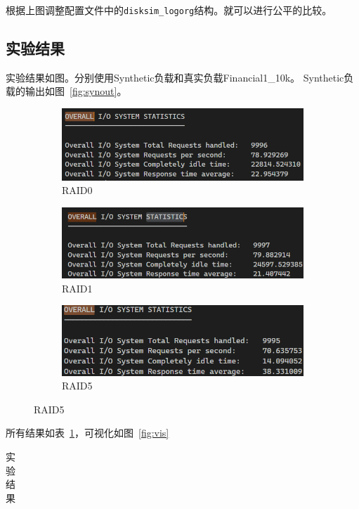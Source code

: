 \documentclass[a4paper,twoside]{article}
\begin{document}
\begin{spacing}{1.2}
根据上图调整配置文件中的\texttt{disksim\_logorg}结构。就可以进行公平的比较。

\subsection{实验结果}
实验结果如图。分别使用Synthetic负载和真实负载Financial1\_10k。
Synthetic负载的输出如图~\ref{fig:synout}。
\begin{figure}[h]
	\centering
	\caption{Synthetic负载的输出}
	\label{fig:synout}
	\begin{subfigure}{0.45\textwidth}
		\centering
		\caption{RAID0}
		\includegraphics[width=0.9\linewidth]{out0.png}
	\end{subfigure}
	\begin{subfigure}{0.45\textwidth}
		\centering
		\caption{RAID1}
		\includegraphics[width=0.9\linewidth]{out1.png}
	\end{subfigure}
	\begin{subfigure}{0.45\textwidth}
		\centering
		\caption{RAID5}
		\includegraphics[width=0.9\linewidth]{out5.png}
	\end{subfigure}
\end{figure}
所有结果如表~\ref{tbl:res}，可视化如图~\ref{fig:vis}
\begin{table}[h]
	\centering
	\caption{实验结果}
	\label{tbl:res}
	\begin{tabular}{c|c|c|c}
		\toprule

\end{tabular}
\end{table}
\end{spacing}
\end{document}
